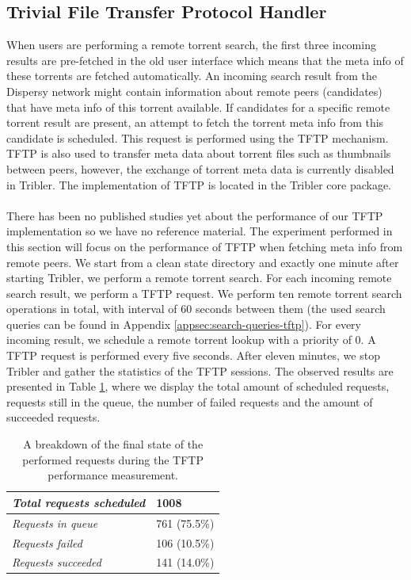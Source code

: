 \subsection{Trivial File Transfer Protocol Handler}
When users are performing a remote torrent search, the first three incoming results are pre-fetched in the old user interface which means that the meta info of these torrents are fetched automatically. An incoming search result from the Dispersy network might contain information about remote peers (candidates) that have meta info of this torrent available. If candidates for a specific remote torrent result are present, an attempt to fetch the torrent meta info from this candidate is scheduled. This request is performed using the TFTP mechanism\cite{sollins1992tftp}. TFTP is also used to transfer meta data about torrent files such as thumbnails between peers, however, the exchange of torrent meta data is currently disabled in Tribler. The implementation of TFTP is located in the Tribler core package.\\\\
There has been no published studies yet about the performance of our TFTP implementation so we have no reference material. The experiment performed in this section will focus on the performance of TFTP when fetching meta info from remote peers. We start from a clean state directory and exactly one minute after starting Tribler, we perform a remote torrent search. For each incoming remote search result, we perform a TFTP request. We perform ten remote torrent search operations in total, with interval of 60 seconds between them (the used search queries can be found in Appendix \ref{appsec:search-queries-tftp}). For every incoming result, we schedule a remote torrent lookup with a priority of 0. A TFTP request is performed every five seconds. After eleven minutes, we stop Tribler and gather the statistics of the TFTP sessions. The observed results are presented in Table \ref{table:tftp-performance}, where we display the total amount of scheduled requests, requests still in the queue, the number of failed requests and the amount of succeeded requests.\\

\begin{table}[h!]
	\centering
	\begin{tabular}{|l|l|}
		\hline
		\emph{Total requests scheduled} & 1008 \\ \hline
		\emph{Requests in queue} & 761 (75.5\%)\\ \hline
		\emph{Requests failed} & 106 (10.5\%)\\ \hline
		\emph{Requests succeeded} & 141 (14.0\%)\\ \hline
	\end{tabular}
	\caption{A breakdown of the final state of the performed requests during the TFTP performance measurement.}
	\label{table:tftp-performance}
\end{table}

